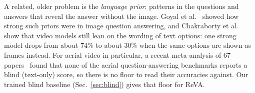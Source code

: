 A related, older problem is the \emph{language prior}: patterns in the
questions and answers that reveal the answer without the image. Goyal et
al.~\cite{goyal2017vqav2} showed how strong such priors were in image
question answering, and Chakraborty et al.~\cite{chakraborty2026visualoptions}
show that video models still lean on the wording of text options: one strong
model drops from about 74\% to about 30\% when the same options are shown as
frames instead. For aerial video in particular, a recent meta-analysis of 67
papers~\cite{angelidis2026aerialgap} found that none of the aerial
question-answering benchmarks reports a blind (text-only) score, so there is
no floor to read their accuracies against. Our trained blind baseline
(Sec.~\ref{sec:blind}) gives that floor for ReVA.
